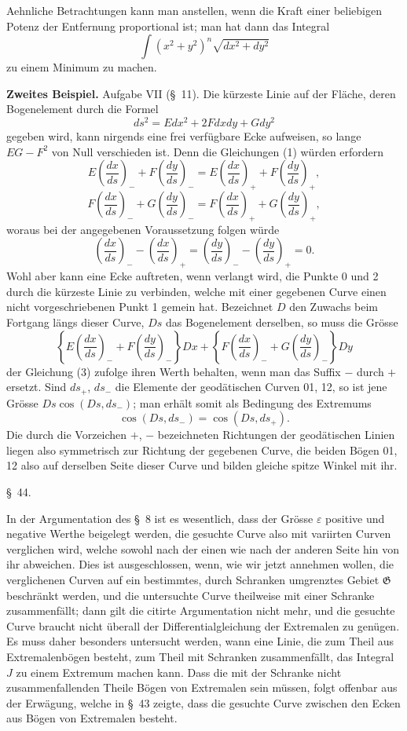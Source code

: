 \documentclass[11pt,a4paper,leqno]{article}
\begin{document}
Aehnliche Betrachtungen kann man anstellen, wenn die Kraft einer beliebigen Potenz der Entfernung proportional ist; man hat dann das Integral
\[
\int (x^2+y^2)^n\sqrt{dx^2+dy^2}
\]
zu einem Minimum zu machen.

\textbf{Zweites Beispiel.} Aufgabe VII (\S~11). Die kürzeste Linie auf der Fläche, deren Bogenelement durch die Formel
\[
ds^2=Edx^2+2Fdxdy+Gdy^2
\]
gegeben wird, kann nirgends eine frei verfügbare Ecke aufweisen, so lange $EG-F^2$ von Null verschieden ist. Denn die Gleichungen (1) würden erfordern
\[
E\left(\frac{dx}{ds}\right)_{-}+F\left(\frac{dy}{ds}\right)_{-}
=E\left(\frac{dx}{ds}\right)_{+}+F\left(\frac{dy}{ds}\right)_{+},
\]
\[
F\left(\frac{dx}{ds}\right)_{-}+G\left(\frac{dy}{ds}\right)_{-}
=F\left(\frac{dx}{ds}\right)_{+}+G\left(\frac{dy}{ds}\right)_{+},
\]
woraus bei der angegebenen Voraussetzung folgen würde
\[
\left(\frac{dx}{ds}\right)_{-}-\left(\frac{dx}{ds}\right)_{+}
=
\left(\frac{dy}{ds}\right)_{-}-\left(\frac{dy}{ds}\right)_{+}=0.
\]
Wohl aber kann eine Ecke auftreten, wenn verlangt wird, die Punkte 0 und 2 durch die kürzeste Linie zu verbinden, welche mit einer gegebenen Curve einen nicht vorgeschriebenen Punkt 1 gemein hat. Bezeichnet $D$ den Zuwachs beim Fortgang längs dieser Curve, $Ds$ das Bogenelement derselben, so muss die Grösse
\[
\left\{E\left(\frac{dx}{ds}\right)_{-}+F\left(\frac{dy}{ds}\right)_{-}\right\}Dx
+
\left\{F\left(\frac{dx}{ds}\right)_{-}+G\left(\frac{dy}{ds}\right)_{-}\right\}Dy
\]
der Gleichung (3) zufolge ihren Werth behalten, wenn man das Suffix $-$ durch $+$ ersetzt. Sind $ds_+$, $ds_-$ die Elemente der geodätischen Curven 01, 12, so ist jene Grösse $Ds\cos(Ds,ds_-)$; man erhält somit als Bedingung des Extremums
\[
\cos(Ds,ds_-)=\cos(Ds,ds_+).
\]
Die durch die Vorzeichen $+$, $-$ bezeichneten Richtungen der geodätischen Linien liegen also symmetrisch zur Richtung der gegebenen Curve, die beiden Bögen 01, 12 also auf derselben Seite dieser Curve und bilden gleiche spitze Winkel mit ihr.

\begin{center}
{\large \S~44.}
\end{center}

In der Argumentation des \S~8 ist es wesentlich, dass der Grösse $\varepsilon$ positive und negative Werthe beigelegt werden, die gesuchte Curve also mit variirten Curven verglichen wird, welche sowohl nach der einen wie nach der anderen Seite hin von ihr abweichen. Dies ist ausgeschlossen, wenn, wie wir jetzt annehmen wollen, die verglichenen Curven auf ein bestimmtes, durch Schranken umgrenztes Gebiet $\mathfrak{G}$ beschränkt werden, und die untersuchte Curve theilweise mit einer Schranke zusammenfällt; dann gilt die citirte Argumentation nicht mehr, und die
gesuchte Curve braucht nicht überall der Differentialgleichung der Extremalen zu genügen. Es muss daher besonders untersucht werden, wann eine Linie, die zum Theil aus Extremalenbögen besteht, zum Theil mit Schranken zusammenfällt, das Integral $J$ zu einem Extremum machen kann. Dass die mit der Schranke nicht zusammenfallenden Theile Bögen von Extremalen sein müssen, folgt offenbar aus der Erwägung, welche in \S~43 zeigte, dass die gesuchte Curve zwischen den Ecken aus Bögen von Extremalen besteht.
\end{document}
